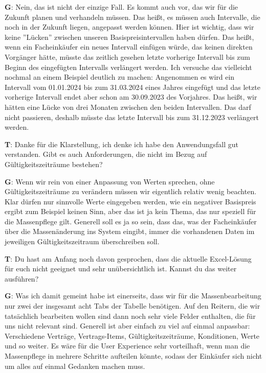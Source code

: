\begin{list}{X:}{\setlength{\labelsep}{5mm}}
 \item[\textbf{G}:] Nein, das ist nicht der einzige Fall. Es kommt auch vor, das wir für die Zukunft planen und verhandeln müssen. Das hei\ss t, es müssen auch Intervalle, die noch in der Zukunft liegen, angepasst werden können. Hier ist wichtig, dass wir keine ''Lücken'' zwischen unseren Basispreisintervallen haben dürfen. Das hei\ss t, wenn ein Facheinkäufer ein neues Intervall einfügen würde, das keinen direkten Vorgänger hätte, müsste das zeitlich gesehen letzte vorherige Intervall bis zum Beginn des eingefügten Intervalls verlängert werden. Ich versuche das vielleicht nochmal an einem Beispiel deutlich zu machen: Angenommen es wird ein Intervall vom 01.01.2024 bis zum 31.03.2024 eines Jahres eingefügt und das letzte vorherige Intervall endet aber schon am 30.09.2023 des Vorjahres. Das hei\ss t, wir hätten eine Lücke von drei Monaten zwischen den beiden Intervallen. Das darf nicht passieren, deshalb müsste das letzte Intervall bis zum 31.12.2023 verlängert werden.
 \item[\textbf{T}:] Danke für die Klarstellung, ich denke ich habe den Anwendungsfall gut verstanden. Gibt es auch Anforderungen, die nicht im Bezug auf Gültigkeitszeiträume bestehen?
 \item[\textbf{G}:] Wenn wir rein von einer Anpassung von Werten sprechen, ohne Gültigkeitszeiträume zu verändern müssen wir eigentlich relativ wenig beachten. Klar dürfen nur sinnvolle Werte eingegeben werden, wie \zB ein negativer Basispreis ergibt zum Beispiel keinen Sinn, aber das ist ja kein Thema, das nur speziell für die Massenpflege gilt. Generell soll es ja so sein, dass das, was der Facheinkäufer über die Massenänderung ins System eingibt, immer die vorhandenen Daten im jeweiligen Gültigkeitszeitraum überschreiben soll.
 \item[\textbf{T}:] Du hast am Anfang noch davon gesprochen, dass die aktuelle Excel-Lösung für euch nicht geeignet und sehr unübersichtlich ist. Kannst du das weiter ausführen?
 \item[\textbf{G}:] Was ich damit gemeint habe ist einerseits, dass wir für die Massenbearbeitung nur zwei der insgesamt acht Tabs der Tabelle benötigen. Auf den Reitern, die wir tatsächlich bearbeiten wollen sind dann noch sehr viele Felder enthalten, die für uns nicht relevant sind. Generell ist aber einfach zu viel auf einmal anpassbar: Verschiedene Verträge, Vertrags-Items, Gültigkeitszeiträume, Konditionen, Werte und so weiter. Es wäre für die User Experience sehr vorteilhaft, wenn man die Massenpflege in mehrere Schritte aufteilen könnte, sodass der Einkäufer sich nicht um alles auf einmal Gedanken machen muss. 

\end{list}
